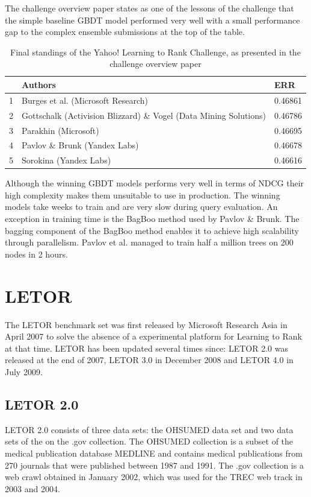 The challenge overview paper \cite{Chapelle2011a} states as one of the lessons of the challenge that the simple baseline \ac{GBDT} model performed very well with a small performance gap to the complex ensemble submissions at the top of the table.\\

\begin{table}
\begin{tabular}{l|p{6.3cm}|l}
 & Authors & ERR \\
 \hline 
1 & Burges et al. (Microsoft Research) & 0.46861 \\ 
2 & Gottschalk (Activision Blizzard) \& Vogel (Data Mining Solutions) & 0.46786 \\ 
3 & Parakhin (Microsoft) & 0.46695 \\ 
4 & Pavlov \& Brunk (Yandex Labs) & 0.46678 \\ 
5 & Sorokina (Yandex Labs) & 0.46616 \\ 
\end{tabular}
\caption{Final standings of the Yahoo! Learning to Rank Challenge, as presented in the challenge overview paper \cite{Chapelle2011a}}
\label{fig:yahoo_results}
\end{table}

Although the winning \ac{GBDT} models performs very well in terms of \ac{NDCG} their high complexity makes them unsuitable to use in production. The winning models take weeks to train and are very slow during query evaluation. An exception in training time is the BagBoo \cite{Pavlov2010} method used by Pavlov \& Brunk. The bagging component of the BagBoo method enables it to achieve high scalability through parallelism. Pavlov et al. \cite{Pavlov2010} managed to train half a million trees on 200 nodes in 2 hours.

\section{LETOR}
The LETOR benchmark set was first released by Microsoft Research Asia in April 2007 \cite{Liu2007b} to solve the absence of a experimental platform for Learning to Rank at that time. LETOR has been updated several times since: LETOR 2.0 was released at the end of 2007, LETOR 3.0 \cite{Qin2010} in December 2008 and LETOR 4.0 \cite{Qin2013} in July 2009.

\subsection{LETOR 2.0}
LETOR 2.0 consists of three data sets: the OHSUMED data set and two data sets of the on the .gov collection. The OHSUMED collection is a subset of the medical publication database MEDLINE and contains medical publications from 270 journals that were published between 1987 and 1991. The .gov collection is a web crawl obtained in January 2002, which was used for the \ac{TREC} web track in 2003 and 2004.\\

